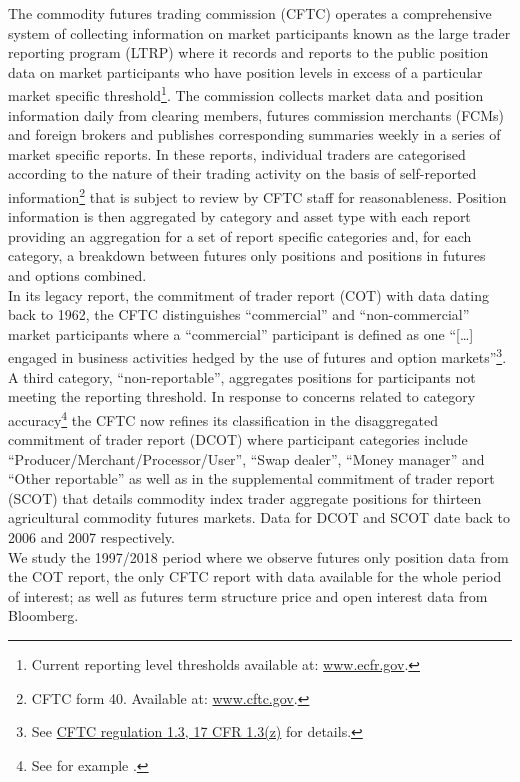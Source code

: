 \documentclass[
  authoryear,
  preprint,
  3p]{elsarticle}
\begin{document}
The commodity futures trading commission (CFTC) operates a comprehensive
system of collecting information on market participants known as the
large trader reporting program (LTRP) where it records and reports to
the public position data on market participants who have position levels
in excess of a particular market specific threshold\footnote{Current
  reporting level thresholds available at:
  \href{https://www.ecfr.gov/cgi-bin/retrieveECFR?gp=&SID=970471b8455f4bab7db4110cfde50731&mc=true&r=SECTION&n=se17.1.15_103}{www.ecfr.gov}.}.
The commission collects market data and position information daily from
clearing members, futures commission merchants (FCMs) and foreign
brokers and publishes corresponding summaries weekly in a series of
market specific reports. In these reports, individual traders are
categorised according to the nature of their trading activity on the
basis of self-reported information\footnote{CFTC form 40. Available at:
  \href{https://www.cftc.gov/sites/default/files/idc/groups/public/@forms/documents/file/cftcform40.pdf}{www.cftc.gov}.}
that is subject to review by CFTC staff for reasonableness. Position
information is then aggregated by category and asset type with each
report providing an aggregation for a set of report specific categories
and, for each category, a breakdown between futures only positions and
positions in futures and options combined.\\
In its legacy report, the commitment of trader report (COT) with data
dating back to 1962, the CFTC distinguishes ``commercial'' and
``non-commercial'' market participants where a ``commercial''
participant is defined as one ``{[}\ldots{]} engaged in business
activities hedged by the use of futures and option markets''\footnote{See
  \href{https://www.gpo.gov/fdsys/pkg/CFR-1998-title17-vol1/xml/CFR-1998-title17-vol1-sec1-3.xml}{CFTC
  regulation 1.3, 17 CFR 1.3(z)} for details.}. A third category,
``non-reportable'', aggregates positions for participants not meeting
the reporting threshold. In response to concerns related to category
accuracy\footnote{See for example \citet{ederington_who_2002}.} the CFTC
now refines its classification in the disaggregated commitment of trader
report (DCOT) where participant categories include
``Producer/Merchant/Processor/User'', ``Swap dealer'', ``Money manager''
and ``Other reportable'' as well as in the supplemental commitment of
trader report (SCOT) that details commodity index trader aggregate
positions for thirteen agricultural commodity futures markets. Data for
DCOT and SCOT date back to 2006 and 2007 respectively.\\
We study the 1997/2018 period where we observe futures only position
data from the COT report, the only CFTC report with data available for
the whole period of interest; as well as futures term structure price
and open interest data from Bloomberg.
\end{document}
